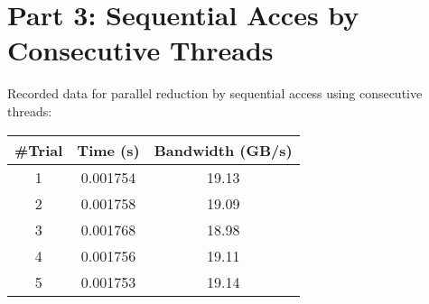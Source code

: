 \section{Part 3: Sequential Acces by Consecutive Threads}
\label{sec:part3}

Recorded data for parallel reduction by sequential access using consecutive threads:

\begin{center}
	\begin{tabular}{||c c c||} 
		\hline
		\#Trial & Time (s) & Bandwidth (GB/s) \\ [0.5ex] 
		\hline\hline
		1 & 0.001754 & 19.13 \\ 
		\hline
		2 & 0.001758 & 19.09 \\
		\hline
		3 & 0.001768 & 18.98 \\
		\hline
		4 & 0.001756 & 19.11 \\
		\hline
		5 & 0.001753 & 19.14 \\
		\hline
	\end{tabular}
\end{center}